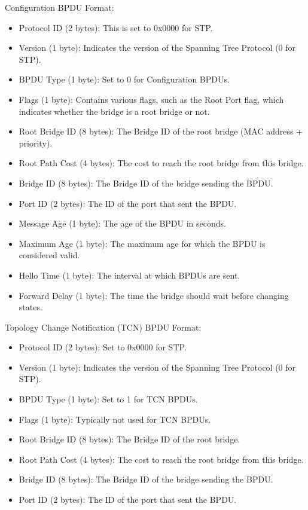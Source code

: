 \documentclass{article}
\begin{document}
Configuration BPDU Format:
\begin{itemize}
\item Protocol ID (2 bytes): This is set to 0x0000 for STP.
\item Version (1 byte): Indicates the version of the Spanning Tree Protocol (0 for STP).
\item BPDU Type (1 byte): Set to 0 for Configuration BPDUs.
\item Flags (1 byte): Contains various flags, such as the Root Port flag, which indicates whether the bridge is a root bridge or not.
\item Root Bridge ID (8 bytes): The Bridge ID of the root bridge (MAC address + priority).
\item Root Path Cost (4 bytes): The cost to reach the root bridge from this bridge.
\item Bridge ID (8 bytes): The Bridge ID of the bridge sending the BPDU.
\item Port ID (2 bytes): The ID of the port that sent the BPDU.
\item Message Age (1 byte): The age of the BPDU in seconds.
\item Maximum Age (1 byte): The maximum age for which the BPDU is considered valid.
\item Hello Time (1 byte): The interval at which BPDUs are sent.
\item Forward Delay (1 byte): The time the bridge should wait before changing states.
\end{itemize}

Topology Change Notification (TCN) BPDU Format:
\begin{itemize}
\item Protocol ID (2 bytes): Set to 0x0000 for STP.
\item Version (1 byte): Indicates the version of the Spanning Tree Protocol (0 for STP).
\item BPDU Type (1 byte): Set to 1 for TCN BPDUs.
\item Flags (1 byte): Typically not used for TCN BPDUs.
\item Root Bridge ID (8 bytes): The Bridge ID of the root bridge.
\item Root Path Cost (4 bytes): The cost to reach the root bridge from this bridge.
\item Bridge ID (8 bytes): The Bridge ID of the bridge sending the BPDU.
\item Port ID (2 bytes): The ID of the port that sent the BPDU.
\end{itemize}
\end{document}
